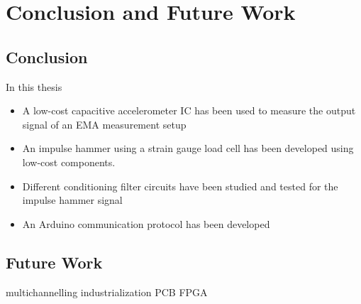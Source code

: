 \chapter{Conclusion and Future Work}

\section{Conclusion}
In this thesis
\begin{itemize}
    \item A low-cost capacitive accelerometer \ac{IC} has been used to measure the output signal of an \ac{EMA} measurement setup
    \item An impulse hammer using a strain gauge load cell has been developed using low-cost components.
    \item Different conditioning filter circuits have been studied and tested for the impulse hammer signal
    \item An Arduino communication protocol has been developed
\end{itemize}

\section{Future Work}
multichannelling
industrialization
\ac{PCB}
\ac{FPGA}